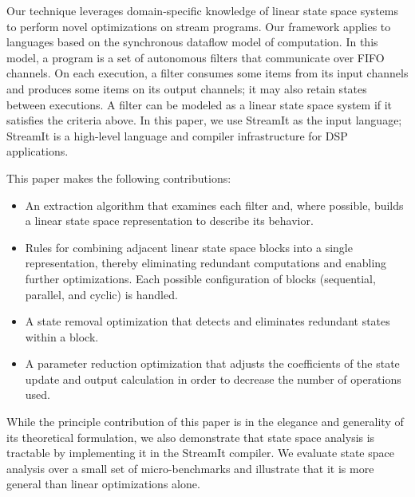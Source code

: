 Our technique leverages domain-specific knowledge of linear state
space systems to perform novel optimizations on stream programs.  Our
framework applies to languages based on the synchronous dataflow model
of computation.  In this model, a program is a set of autonomous
filters that communicate over FIFO channels.  On each execution, a
filter consumes some items from its input channels and produces some
items on its output channels; it may also retain states between
executions.  A filter can be modeled as a linear state space system if
it satisfies the criteria above.  In this paper, we use StreamIt as
the input language; StreamIt is a high-level language and compiler
infrastructure for DSP applications.

This paper makes the following contributions:

\begin{itemize}

\vspace{\itemshrink} \item An extraction algorithm that examines each
filter and, where possible, builds a linear state space representation
to describe its behavior.

\vspace{\itemshrink} \item Rules for combining adjacent linear state space
blocks into a single representation, thereby eliminating redundant
computations and enabling further optimizations.  Each possible
configuration of blocks (sequential, parallel, and cyclic) is handled.

\vspace{\itemshrink} \item A state removal optimization that detects
and eliminates redundant states within a block.

\vspace{\itemshrink} \item A parameter reduction optimization that
adjusts the coefficients of the state update and output calculation in
order to decrease the number of operations used.

\vspace{\itemshrink} \end{itemize}

While the principle contribution of this paper is in the elegance and
generality of its theoretical formulation, we also demonstrate that
state space analysis is tractable by implementing it in the StreamIt
compiler.  We evaluate state space analysis over a small set of
micro-benchmarks and illustrate that it is more general than linear
optimizations alone.

